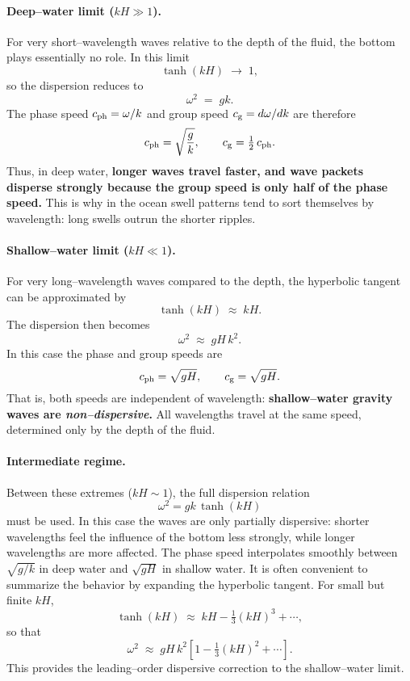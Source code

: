 \paragraph{Deep–water limit ($kH \gg 1$).}
For very short–wavelength waves relative to the depth of the fluid, the bottom plays essentially no role. In this limit
\[
\tanh(kH) \;\to\; 1,
\]
so the dispersion reduces to
\begin{equation}
\omega^2 \;=\; g k.
\label{eq:disp_deep}
\end{equation}
The phase speed $c_{\rm ph} = \omega/k$ and group speed $c_{\rm g} = d\omega/dk$ are therefore
\[
c_{\rm ph} = \sqrt{\frac{g}{k}},
\qquad
c_{\rm g} = \tfrac{1}{2}\,c_{\rm ph}.
\]
Thus, in deep water, \textbf{longer waves travel faster, and wave packets disperse strongly because the group speed is only half of the phase speed.} This is why in the ocean swell patterns tend to sort themselves by wavelength: long swells outrun the shorter ripples.

\paragraph{Shallow–water limit ($kH \ll 1$).}
For very long–wavelength waves compared to the depth, the hyperbolic tangent can be approximated by
\[
\tanh(kH) \;\approx\; kH.
\]
The dispersion then becomes
\begin{equation}
\omega^2 \;\approx\; gH\,k^2.
\label{eq:disp_shallow}
\end{equation}
In this case the phase and group speeds are
\[
c_{\rm ph} = \sqrt{gH}, \qquad c_{\rm g} = \sqrt{gH}.
\]
That is, both speeds are independent of wavelength: \textbf{shallow–water gravity waves are \emph{non–dispersive}.} All wavelengths travel at the same speed, determined only by the depth of the fluid.

\paragraph{Intermediate regime.}
Between these extremes ($kH \sim 1$), the full dispersion relation
\[
\omega^2 = gk\,\tanh(kH)
\]
must be used. In this case the waves are only partially dispersive: shorter wavelengths feel the influence of the bottom less strongly, while longer wavelengths are more affected. The phase speed interpolates smoothly between $\sqrt{g/k}$ in deep water and $\sqrt{gH}$ in shallow water. It is often convenient to summarize the behavior by expanding the hyperbolic tangent. For small but finite $kH$,
\[
\tanh(kH) \;\approx\; kH - \tfrac{1}{3}(kH)^3 + \cdots,
\]
so that
\[
\omega^2 \;\approx\; gH\,k^2 \left[ 1 - \tfrac{1}{3}(kH)^2 + \cdots \right].
\]
This provides the leading–order dispersive correction to the shallow–water limit.

